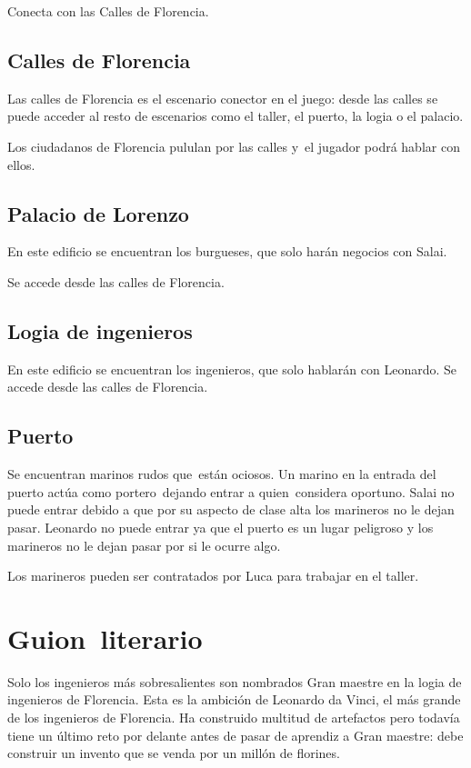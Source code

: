 {
Conecta con las Calles de Florencia.}

\subsection[Calles de Florencia]{ Calles de Florencia}
\hypertarget{Toc484614260}{}{
Las calles de Florencia es el escenario conector en el juego: desde las calles se puede acceder al resto de escenarios
como el taller, el puerto, la logia o el palacio.}

{
Los ciudadanos de Florencia pululan por las calles y\ el jugador podr\'a hablar con ellos.}

\subsection[Palacio de Lorenzo]{ Palacio de Lorenzo}
\hypertarget{Toc484614261}{}{
En este edificio se encuentran los burgueses, que solo har\'an negocios con Salai.}

{
Se accede desde las calles de Florencia.}

\subsection[Logia de ingenieros]{ Logia de ingenieros}
\hypertarget{Toc484614262}{}{
En este edificio se encuentran los ingenieros, que solo hablar\'an con Leonardo. Se accede desde las calles de
Florencia.}

\subsection[Puerto]{ Puerto}
\hypertarget{Toc484614263}{}{
Se encuentran marinos rudos que\ est\'an ociosos. Un marino en la entrada del puerto act\'ua como portero\ dejando
entrar a quien\ considera oportuno. Salai no puede entrar debido a que por su aspecto de clase alta los marineros no le
dejan pasar. Leonardo no puede entrar ya que el puerto es un lugar peligroso y los marineros no le dejan pasar por si
le ocurre algo.}

{
Los marineros pueden ser contratados por Luca para trabajar en el taller.}

\section[Guion\ literario]{ Guion\ literario}
\label{guionLiterario}
\hypertarget{Toc484614264}{}{
Solo los ingenieros m\'as sobresalientes son nombrados Gran maestre en la logia de ingenieros de Florencia. Esta es la
ambici\'on de Leonardo da Vinci, el m\'as grande de los ingenieros de Florencia. Ha construido multitud de artefactos
pero todav\'ia tiene un \'ultimo reto por delante antes de pasar de aprendiz a Gran maestre: debe construir un invento
que se venda por un mill\'on de florines.}

